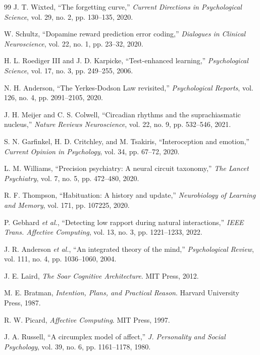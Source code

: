 \documentclass[journal,twoside]{IEEEtran}
\begin{document}
\begin{thebibliography}{99}
J. T. Wixted, ``The forgetting curve,'' \textit{Current Directions in Psychological Science}, vol. 29, no. 2, pp. 130--135, 2020.

W. Schultz, ``Dopamine reward prediction error coding,'' \textit{Dialogues in Clinical Neuroscience}, vol. 22, no. 1, pp. 23--32, 2020.

H. L. Roediger III and J. D. Karpicke, ``Test-enhanced learning,'' \textit{Psychological Science}, vol. 17, no. 3, pp. 249--255, 2006.

N. H. Anderson, ``The Yerkes-Dodson Law revisited,'' \textit{Psychological Reports}, vol. 126, no. 4, pp. 2091--2105, 2020.

J. H. Meijer and C. S. Colwell, ``Circadian rhythms and the suprachiasmatic nucleus,'' \textit{Nature Reviews Neuroscience}, vol. 22, no. 9, pp. 532--546, 2021.

S. N. Garfinkel, H. D. Critchley, and M. Tsakiris, ``Interoception and emotion,'' \textit{Current Opinion in Psychology}, vol. 34, pp. 67--72, 2020.

L. M. Williams, ``Precision psychiatry: A neural circuit taxonomy,'' \textit{The Lancet Psychiatry}, vol. 7, no. 5, pp. 472--480, 2020.

R. F. Thompson, ``Habituation: A history and update,'' \textit{Neurobiology of Learning and Memory}, vol. 171, pp. 107225, 2020.

P. Gebhard \textit{et al.}, ``Detecting low rapport during natural interactions,'' \textit{IEEE Trans. Affective Computing}, vol. 13, no. 3, pp. 1221--1233, 2022.

J. R. Anderson \textit{et al.}, ``An integrated theory of the mind,'' \textit{Psychological Review}, vol. 111, no. 4, pp. 1036--1060, 2004.

J. E. Laird, \textit{The Soar Cognitive Architecture}. MIT Press, 2012.

M. E. Bratman, \textit{Intention, Plans, and Practical Reason}. Harvard University Press, 1987.

R. W. Picard, \textit{Affective Computing}. MIT Press, 1997.

J. A. Russell, ``A circumplex model of affect,'' \textit{J. Personality and Social Psychology}, vol. 39, no. 6, pp. 1161--1178, 1980.


\end{thebibliography}
\end{document}
